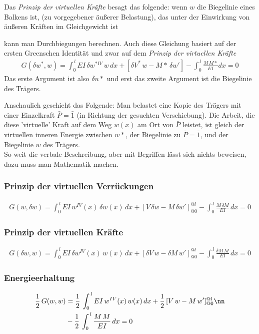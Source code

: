 Das {\em Prinzip der virtuellen Kr\"{a}fte\/} besagt das folgende: wenn $w$ die Biegelinie eines Balkens ist, (zu vorgegebener \"{a}u{\ss}erer Belastung), das unter der Einwirkung von \"{a}u{\ss}eren Kr\"{a}ften im Gleichgewicht ist


 kann man Durchbiegungen berechnen. Auch diese Gleichung basiert auf der ersten Greenschen Identit\"{a}t und zwar auf dem {\em Prinzip der virtuellen Kr\"{a}fte\/}
\begin{align}
G(\delta w^*,w) = \int_0^{\,l} EI\,\delta w^{*IV}\,w\,dx + [\delta V^*\,w - M*\,\delta w'] - \int_0^{\,l} \frac{M\,M*}{EI} dx = 0
\end{align}
Das erste Argument ist also $\delta u*$ und erst das zweite Argument ist die Biegelinie des Tr\"{a}gers.

Anschaulich geschieht das Folgende: Man belastet eine Kopie des Tr\"{a}gers mit einer Einzelkraft $\bar{P} = \bar{1}$ (in Richtung der gesuchten Verschiebung). Die Arbeit, die diese 'virtuelle' Kraft auf dem Weg $w(x)$ am Ort von $\bar{P}$ leistet, ist gleich der virtuellen inneren Energie zwischen $w*$, der Biegelinie zu $\bar{P} = \bar{1}$, und der Biegelinie $w$ des Tr\"{a}gers.\\

So weit die verbale Beschreibung, aber mit Begriffen l\"{a}sst sich nichts beweisen, dazu muss man Mathematik machen.
\\

\subsubsection{Prinzip der virtuellen Verr\"{u}ckungen}
\begin{align}
G(w,\delta w) = \int_0^{\,l} EI\,w^{IV}(x)\,\delta w(x)\,dx + [V\,\delta w - M\,\delta w']_{@0}^{@l} - \int_0^{\,l} \frac{M\, \delta M}{EI}\,dx = 0
\end{align}
\subsubsection{Prinzip der virtuellen Kr\"{a}fte}
\begin{align}
G(\delta w, w) = \int_0^{\,l} EI\,\delta w^{IV}(x)\, w(x)\,dx + [\delta V\, w - \delta M\, w']_{@0}^{@l} - \int_0^{\,l} \frac{\delta M\,  M}{EI}\,dx = 0
\end{align}
\subsubsection{Energieerhaltung}
\begin{align}
\frac{1}{2}\,G(w, w) &= \frac{1}{2}\, \int_0^{\,l} EI\,w^{IV}(x)\, w(x)\,dx + \frac{1}{2}\, [V\, w - M\, w']_{@0}^{@l} \nn\\
&- \frac{1}{2}\, \int_0^{\,l} \frac{M\,  M}{EI}\,dx = 0
\end{align}
